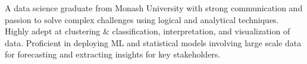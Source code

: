 

\begin{cvparagraph}

\normalsize{A data science graduate from Monash University with strong communication and passion to solve complex challenges using logical and analytical techniques. Highly adept at clustering \& classification, interpretation, and visualization of data. Proficient in deploying ML and statistical models involving large scale data for forecasting and extracting insights for key stakeholders.}
\end{cvparagraph}
